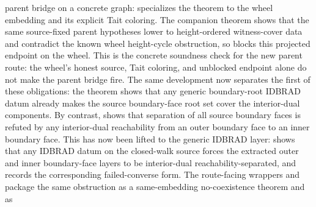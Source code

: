 \documentclass[11pt]{article}
\begin{document}
parent bridge on a concrete graph:
specializes the theorem to the wheel embedding and its explicit Tait coloring.
The companion theorem
shows that the same source-fixed parent hypotheses lower to height-ordered
witness-cover data and contradict the known wheel height-cycle obstruction, so
blocks this projected endpoint on the wheel.  This is the concrete soundness
check for the new parent route: the wheel's honest source, Tait coloring, and
unblocked endpoint alone do not make the parent bridge fire.
The same development now separates the first of these obligations: the theorem
shows that any generic boundary-root IDBRAD datum already makes the source
boundary-face root set cover the interior-dual components.  By contrast,
shows that separation of all source boundary faces is refuted by any interior-dual
reachability from an outer boundary face to an inner boundary face.  This has now
been lifted to the generic IDBRAD layer:
shows that any IDBRAD datum on the closed-walk source forces the extracted
outer and inner boundary-face layers to be interior-dual reachability-separated,
and
records the corresponding failed-converse form.  The route-facing wrappers
and
package the same obstruction as a same-embedding no-coexistence theorem and as
\end{document}
